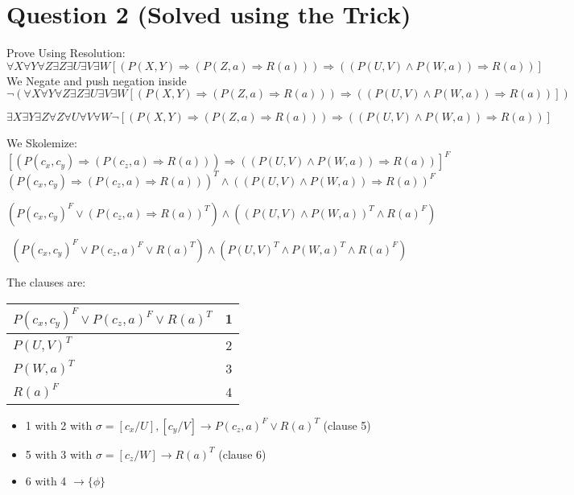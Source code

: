 \documentclass{article}
\begin{document}
\newpage
\section*{Question 2 (Solved using the Trick)}
Prove Using Resolution:
\[
\forall X \forall Y \forall Z \exists Z \exists U \exists V \exists W [(P(X,Y) \Rightarrow (P(Z,a)\Rightarrow R(a))) \Rightarrow ((P(U,V) \land P(W,a)) \Rightarrow R(a))]
\]
We Negate and push negation inside
\[
    \neg (\forall X \forall Y \forall Z \exists Z \exists U \exists V \exists W [(P(X,Y) \Rightarrow (P(Z,a)\Rightarrow R(a))) \Rightarrow ((P(U,V) \land P(W,a)) \Rightarrow R(a))])
\]

\[
    \exists X \exists Y \exists Z \forall Z \forall U \forall V \forall W \neg [(P(X,Y) \Rightarrow (P(Z,a)\Rightarrow R(a))) \Rightarrow ((P(U,V) \land P(W,a)) \Rightarrow R(a))]
\]

We Skolemize:
\[
    [(P(c_x,c_y) \Rightarrow (P(c_z,a)\Rightarrow R(a))) \Rightarrow ((P(U,V) \land P(W,a)) \Rightarrow R(a))]^F
\]
\[
    (P(c_x,c_y) \Rightarrow (P(c_z,a)\Rightarrow R(a)))^T \land
    ((P(U,V) \land P(W,a)) \Rightarrow R(a))^F
\]

\[
    (P(c_x,c_y)^F \lor (P(c_z,a)\Rightarrow R(a))^T) \land
    ((P(U,V) \land P(W,a))^T \land R(a)^F)
\]

\[
    (P(c_x,c_y)^F \lor P(c_z,a)^F \lor R(a)^T) \land
    (P(U,V)^T \land P(W,a)^T \land R(a)^F)
\]

The clauses are:
\begin{tabular}{|l|c|} \hline
    $P(c_x,c_y)^F \lor P(c_z,a)^F \lor R(a)^T$ & 1 \\ \hline
    $P(U,V)^T$ & 2 \\ \hline
    $P(W,a)^T$ & 3 \\ \hline
    $R(a)^F$ & 4 \\ \hline
\end{tabular}
\begin{itemize}
    \item 1 with 2 with $\sigma=[c_x/U],[c_y/V] \to P(c_z,a)^F \lor R(a)^T$ (clause 5)
    \item 5 with 3 with $\sigma=[c_z/W] \to R(a)^T$ (clause 6)
    \item 6 with 4 $\to \{ \phi \}$
\end{itemize}
\end{document}
